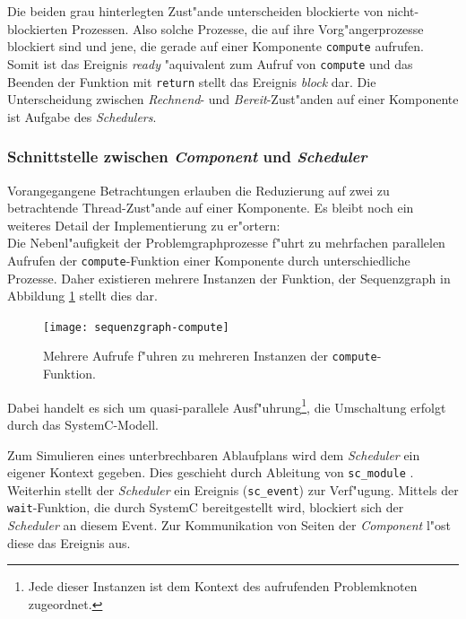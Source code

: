 Die beiden grau hinterlegten Zust"ande unterscheiden blockierte von
nicht-blockierten Prozessen. Also solche Prozesse, die auf ihre
Vorg"angerprozesse blockiert sind und jene, die gerade auf einer Komponente
\verb|compute| aufrufen. Somit ist das Ereignis \emph{ready} "aquivalent zum
Aufruf von \verb|compute| und das Beenden der Funktion mit \verb|return|
stellt das Ereignis \emph{block} dar. Die Unterscheidung zwischen
\emph{Rechnend}- und \emph{Bereit}-Zust"anden auf einer Komponente ist Aufgabe
des \emph{Schedulers}. 


\subsubsection{Schnittstelle zwischen \emph{Component} und \emph{Scheduler}}\label{schnittstelle}


Vorangegangene Betrachtungen erlauben die Reduzierung auf zwei zu betrachtende
Thread-Zust"ande auf einer Komponente. Es bleibt noch ein weiteres Detail der
Implementierung zu er"ortern:\\ Die Nebenl"aufigkeit der Problemgraphprozesse
f"uhrt zu mehrfachen parallelen Aufrufen der \verb|compute|-Funktion einer
Komponente durch unterschiedliche Prozesse. Daher existieren mehrere
Instanzen der Funktion, der Sequenzgraph in Abbildung
\ref{fig:sequenzgraph-compute} stellt dies dar.
\begin{figure}
\begin{center}
\texttt{[image: sequenzgraph-compute]}
\caption{Mehrere Aufrufe f"uhren zu mehreren Instanzen der \texttt{compute}-Funktion.}
\label{fig:sequenzgraph-compute}
\end{center}
\end{figure}
Dabei handelt es sich um quasi-parallele Ausf"uhrung\footnote{Jede dieser Instanzen
ist dem Kontext des aufrufenden Problemknoten zugeordnet.}, die Umschaltung erfolgt
durch das SystemC-Modell. 

Zum Simulieren eines unterbrechbaren Ablaufplans wird dem \emph{Scheduler} ein
eigener Kontext gegeben. Dies geschieht durch Ableitung von
\verb|sc_module| . Weiterhin stellt der \emph{Scheduler} ein Ereignis
(\verb|sc_event|) zur Verf"ugung. Mittels der \verb|wait|-Funktion, die durch SystemC
bereitgestellt wird, blockiert sich der \emph{Scheduler} an diesem Event. Zur
Kommunikation von Seiten der \emph{Component} l"ost diese das Ereignis aus.

